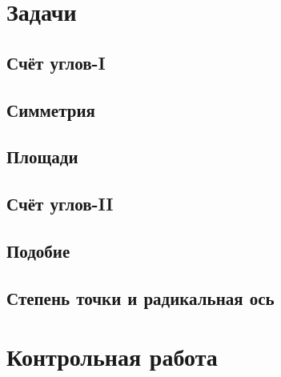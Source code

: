\documentclass[twoside]{article}
\begin{document}
\newpage
\renewcommand{\thesubsection}{\roman{subsection}}
\setcounter{subsection}{0}

\section*{Задачи}
\subsection{Счёт углов-I}

\subsection{Симметрия}  %
% 
\subsection{Площади}

\subsection{Счёт углов-II}


\subsection{Подобие}    %

\subsection{Степень точки и радикальная ось}    %



\newpage
{}
\section*{Контрольная работа}
% 
\end{document}

